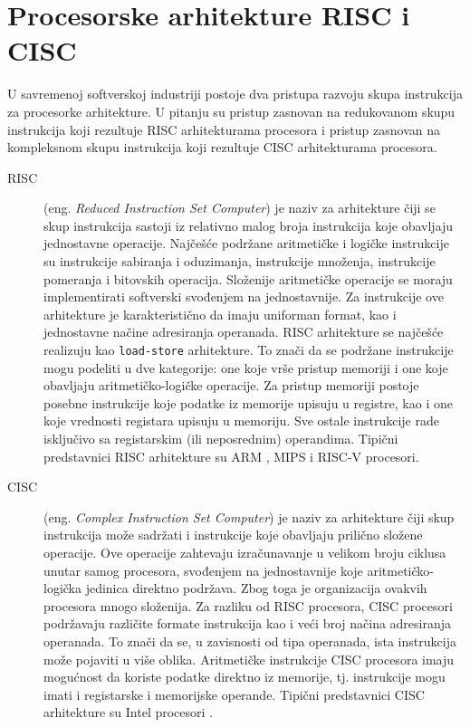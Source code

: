 \documentclass[12pt,oneside]{memoir}
\begin{document}
\section{Procesorske arhitekture RISC i CISC}
U savremenoj softverskoj industriji postoje dva pristupa razvoju skupa instrukcija za procesorke arhitekture. U pitanju su pristup zasnovan na redukovanom skupu instrukcija koji rezultuje RISC arhitekturama procesora i pristup zasnovan na kompleksnom skupu instrukcija koji rezultuje CISC arhitekturama procesora. 
\begin{description}
    \item[RISC] 
(eng. \textit{Reduced Instruction Set Computer}) je naziv za arhitekture čiji se skup instrukcija sastoji iz relativno malog broja instrukcija koje obavljaju jednostavne operacije. Najčešće podržane aritmetičke i logičke instrukcije su 
instrukcije sabiranja i oduzimanja, instrukcije množenja, instrukcije pomeranja i bitovskih operacija. Složenije aritmetičke operacije se moraju implementirati 
softverski svođenjem na jednostavnije. Za instrukcije ove arhitekture je karakteristično da imaju uniforman format, kao i jednostavne načine adresiranja operanada. RISC arhitekture se najčešće realizuju kao \texttt{load-store} arhitekture. To znači da se podržane instrukcije mogu podeliti u dve kategorije: one koje vrše pristup memoriji i one koje obavljaju aritmetičko-logičke operacije.
Za pristup memoriji postoje posebne instrukcije koje podatke iz memorije upisuju u registre, kao i one koje vrednosti registara upisuju u memoriju. Sve ostale instrukcije rade isključivo sa registarskim (ili neposrednim) operandima. Tipični predstavnici RISC arhitekture su ARM \cite{arm_processor}, MIPS \cite{mips_processor} i RISC-V \cite{riscv_processor} procesori.
\item[CISC]
(eng. \textit{Complex Instruction Set Computer}) je naziv za arhitekture čiji skup 
instrukcija može sadržati i instrukcije koje obavljaju prilično složene operacije. Ove operacije zahtevaju izračunavanje u velikom broju ciklusa unutar samog procesora, svođenjem na jednostavnije koje aritmetičko-logička jedinica direktno podržava. Zbog toga je organizacija ovakvih procesora mnogo složenija. Za razliku od RISC procesora, CISC procesori podržavaju različite formate instrukcija kao i veći broj načina adresiranja operanada. To znači da se, u zavisnosti od tipa operanada, ista instrukcija može pojaviti u više oblika. Aritmetičke instrukcije CISC procesora imaju mogućnost da koriste podatke direktno iz memorije, tj. instrukcije mogu imati i registarske i memorijske operande. Tipični predstavnici CISC arhitekture su Intel procesori \cite{intel_processor}.
\end{description}
\end{document}
